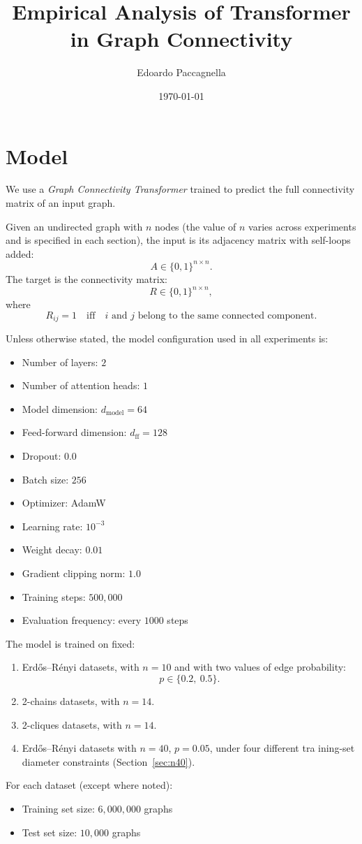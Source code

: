 \documentclass[11pt,a4paper]{article}
\title{Empirical Analysis of Transformer in Graph Connectivity}
\author{Edoardo Paccagnella}
\date{\today}
\begin{document}
\maketitle

\section{Model}

We use a \emph{Graph Connectivity Transformer} trained to predict the full connectivity matrix of an input graph.

Given an undirected graph with \(n\) nodes (the value of \(n\) varies across experiments and is specified 
in each section), the input is its adjacency matrix with self-loops added:
\[
A \in \{0,1\}^{n \times n}.
\]
The target is the connectivity matrix:
\[
R \in \{0,1\}^{n \times n},
\]
where
\[
R_{ij} = 1
\quad \text{iff} \quad
i \text{ and } j \text{ belong to the same connected component.}
\]

Unless otherwise stated, the model configuration used in all experiments is:
\begin{itemize}
    \item Number of layers: \(2\)
    \item Number of attention heads: \(1\)
    \item Model dimension: \(d_{\mathrm{model}} = 64\)
    \item Feed-forward dimension: \(d_{\mathrm{ff}} = 128\)
    \item Dropout: \(0.0\)
    \item Batch size: \(256\)
    \item Optimizer: AdamW
    \item Learning rate: \(10^{-3}\)
    \item Weight decay: \(0.01\)
    \item Gradient clipping norm: \(1.0\)
    \item Training steps: \(500{,}000\)
    \item Evaluation frequency: every \(1000\) steps
\end{itemize}

The model is trained on fixed:
\begin{enumerate}
    \item Erd\H{o}s--R\'enyi datasets, with \(n = 10\) and with two values of edge probability:
\[
p \in \{0.2,\ 0.5\}.
\]
    \item 2-chains datasets, with \(n = 14\).
    \item 2-cliques datasets, with \(n = 14\).
    \item Erd\H{o}s--R\'enyi datasets with \(n = 40\), \(p = 0.05\), under four different tra
    ining-set diameter constraints (Section~\ref{sec:n40}).
\end{enumerate}
For each dataset (except where noted):
\begin{itemize}
    \item Training set size: \(6{,}000{,}000\) graphs
    \item Test set size: \(10{,}000\) graphs
\end{itemize}
\end{document}
